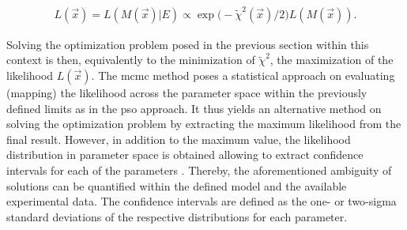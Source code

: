\begin{align}
 L(\vec{x}) = L(M(\vec{x}) | E) \propto \exp \big(- \tilde{\chi}^2(\vec{x}) / 2 \big) L(M(\vec{x})) \text{.} \label{ch_spec:eqn_likelihood}
\end{align}

Solving the optimization problem posed in the previous section within this context is then, equivalently to the minimization of $\tilde{\chi}^2$, the maximization of the likelihood $L(\vec{x})$. The \gls{mcmc} method poses a statistical approach on evaluating (mapping) the likelihood across the parameter space within the previously defined limits as in the \gls{pso} approach. It thus yields an alternative method on solving the optimization problem by extracting the maximum likelihood from the final result. However, in addition to the maximum value, the likelihood distribution in parameter space is obtained allowing to extract confidence intervals for each of the parameters \cite{cox_theoretical_1979}. Thereby, the aforementioned ambiguity of solutions can be quantified within the defined model and the available experimental data. The confidence intervals are defined as the one- or two-sigma standard deviations of the respective distributions for each parameter.

